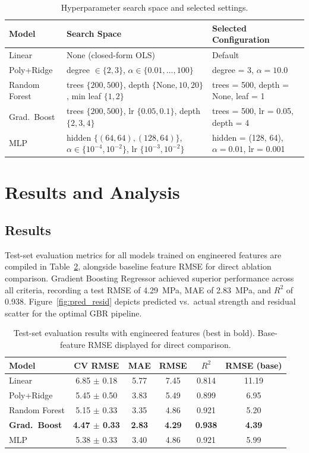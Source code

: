 \documentclass[conference,10pt,a4paper]{IEEEtran}
\begin{document}
\begin{table}[h]
\centering
\caption{Hyperparameter search space and selected settings.}
\label{tab:hypers}
\small
\begin{tabular}{p{1.4cm}p{3.7cm}p{2.3cm}}
\toprule
Model & Search Space & Selected Configuration \\
\midrule
Linear & None (closed-form OLS) & Default \\
Poly+Ridge & degree $\in \{2, 3\}$, $\alpha \in \{0.01, \dots, 100\}$ & degree = 3, $\alpha = 10.0$ \\
Random Forest & trees $\{200, 500\}$, depth $\{\text{None}, 10, 20\}$, min leaf $\{1, 2\}$ & trees = 500, depth = None, leaf = 1 \\
Grad.\ Boost & trees $\{200, 500\}$, lr $\{0.05, 0.1\}$, depth $\{2, 3, 4\}$ & trees = 500, lr = 0.05, depth = 4 \\
MLP & hidden $\{(64, 64), (128, 64)\}$, $\alpha \in \{10^{-4}, 10^{-2}\}$, lr $\{10^{-3}, 10^{-2}\}$ & hidden = (128, 64), $\alpha = 0.01$, lr = 0.001 \\
\bottomrule
\end{tabular}
\end{table}

\section{Results and Analysis}
\subsection{Results}
Test-set evaluation metrics for all models trained on engineered features are compiled in Table~\ref{tab:results}, alongside baseline feature RMSE for direct ablation comparison. Gradient Boosting Regressor achieved superior performance across all criteria, recording a test RMSE of 4.29~MPa, MAE of 2.83~MPa, and $R^2$ of 0.938. Figure~\ref{fig:pred_resid} depicts predicted vs.\ actual strength and residual scatter for the optimal GBR pipeline.

\begin{table}[h]
\centering
\caption{Test-set evaluation results with engineered features (best in bold). Base-feature RMSE displayed for direct comparison.}
\label{tab:results}
\small
\begin{tabular}{lccccc}
\toprule
Model & CV RMSE & MAE & RMSE & $R^2$ & RMSE (base) \\
\midrule
Linear & 6.85 $\pm$ 0.18 & 5.77 & 7.45 & 0.814 & 11.19 \\
Poly+Ridge & 5.45 $\pm$ 0.50 & 3.83 & 5.49 & 0.899 & 6.95 \\
Random Forest & 5.15 $\pm$ 0.33 & 3.35 & 4.86 & 0.921 & 5.20 \\
\textbf{Grad.\ Boost} & \textbf{4.47 $\pm$ 0.33} & \textbf{2.83} & \textbf{4.29} & \textbf{0.938} & \textbf{4.39} \\
MLP & 5.38 $\pm$ 0.33 & 3.40 & 4.86 & 0.921 & 5.99 \\
\bottomrule
\end{tabular}
\end{table}
\end{document}
